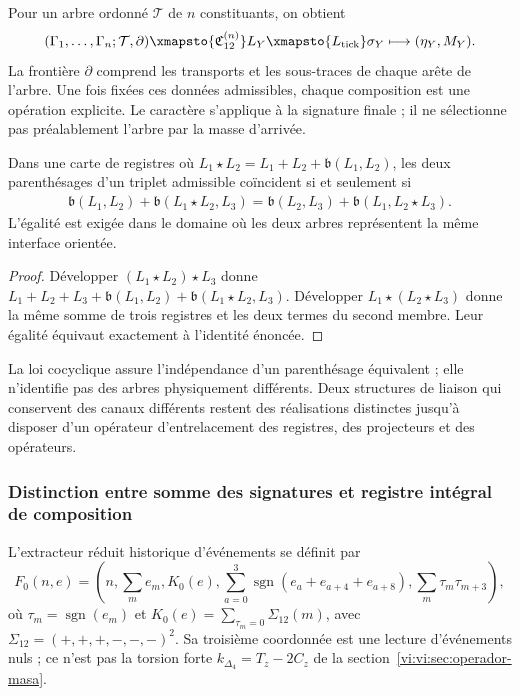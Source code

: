 Pour un arbre ordonné \(\mathcal T\) de \(n\) constituants, on obtient
\begin{equation}
 (\Gamma_1,\ldots,\Gamma_n;\mathcal T,\partial)
 \xmapsto{\mathfrak C_{12}^{(n)}}L_Y
 \xmapsto{L_{\mathrm{tick}}}\sigma_Y
 \longmapsto (\eta_Y,M_Y).
 \label{vi:vi:eq:cadena-compuesto}
\end{equation}
La frontière \(\partial\) comprend les transports et les sous-traces de chaque
arête de l’arbre. Une fois fixées ces données admissibles, chaque composition
est une opération explicite. Le caractère s’applique à la signature finale ;
il ne sélectionne pas préalablement l’arbre par la masse d’arrivée.

\begin{proposition}
\label{vi:vi:prop:cociclo-compuesto}
Dans une carte de registres où
\(L_1\star L_2=L_1+L_2+\mathfrak b(L_1,L_2)\), les deux
parenthésages d'un triplet admissible coïncident si et seulement si
\begin{align*}
 \mathfrak b(L_1,L_2)+\mathfrak b(L_1\star L_2,L_3)
 =\mathfrak b(L_2,L_3)+\mathfrak b(L_1,L_2\star L_3).
\end{align*}
L’égalité est exigée dans le domaine où les deux arbres représentent la
même interface orientée.
\end{proposition}
\begin{proof}
Développer \((L_1\star L_2)\star L_3\) donne
\(L_1+L_2+L_3+\mathfrak b(L_1,L_2)+\mathfrak b(L_1\star L_2,L_3)\).
Développer \(L_1\star(L_2\star L_3)\) donne la même somme de trois
registres et les deux termes du second membre. Leur égalité équivaut
exactement à l’identité énoncée.
\end{proof}

La loi cocyclique assure l’indépendance d’un parenthésage équivalent ;
elle n’identifie pas des arbres physiquement différents. Deux structures de liaison
qui conservent des canaux différents restent des réalisations distinctes
jusqu’à disposer d’un opérateur d’entrelacement des registres, des projecteurs et des opérateurs.

\subsubsection{Distinction entre somme des signatures et registre intégral de composition}

L’extracteur réduit historique d’événements se définit par
\[
 F_0(n,e)=\left(n,\sum_m e_m,K_0(e),
 \sum_{a=0}^3\operatorname{sgn}(e_a+e_{a+4}+e_{a+8}),
 \sum_m\tau_m\tau_{m+3}\right),
\]
où \(\tau_m=\operatorname{sgn}(e_m)\) et
\(K_0(e)=\sum_{\tau_m=0}\Sigma_{12}(m)\), avec
\(\Sigma_{12}=(+,+,+,-,-,-)^2\). Sa troisième coordonnée est une
lecture d’événements nuls ; ce n’est pas la torsion forte
\(k_{\Delta_4}=T_z-2C_z\) de la
section~\ref{vi:vi:sec:operador-masa}.

